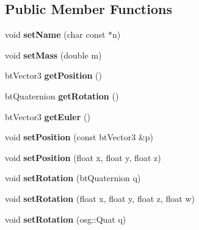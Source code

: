 \subsection*{Public Member Functions}
\begin{DoxyCompactItemize}
\item 
\mbox{\label{classbtosgObject_ab06a1b3f357209214c6440cd5746523e}} 
void {\bfseries set\+Name} (char const $\ast$n)
\item 
\mbox{\label{classbtosgObject_a91da93c82d48b86192f0cbb16054fe57}} 
void {\bfseries set\+Mass} (double m)
\item 
\mbox{\label{classbtosgObject_a77a1434498d7a6d00c415042a995d119}} 
bt\+Vector3 {\bfseries get\+Position} ()
\item 
\mbox{\label{classbtosgObject_a9cadb03762699412552601196950a039}} 
bt\+Quaternion {\bfseries get\+Rotation} ()
\item 
\mbox{\label{classbtosgObject_afef1fe06635566ab9cee134f72439e02}} 
bt\+Vector3 {\bfseries get\+Euler} ()
\item 
\mbox{\label{classbtosgObject_ad0f76df8e8bde6c8a9d1b1d53551172b}} 
void {\bfseries set\+Position} (const bt\+Vector3 \&p)
\item 
\mbox{\label{classbtosgObject_adb9f2cff0faf66dc252cd7c97b11ac84}} 
void {\bfseries set\+Position} (float x, float y, float z)
\item 
\mbox{\label{classbtosgObject_a656412794a971a10478aedb520f298bf}} 
void {\bfseries set\+Rotation} (bt\+Quaternion q)
\item 
\mbox{\label{classbtosgObject_a4d21ca59b944fd26644db35d3e9ba67a}} 
void {\bfseries set\+Rotation} (float x, float y, float z, float w)
\item 
\mbox{\label{classbtosgObject_ae803e0566f0d7b3ffca686b968b297f8}} 
void {\bfseries set\+Rotation} (osg\+::\+Quat q)
\item 
\mbox{\label{classbtosgObject_aff54acbc7c66811efb0cf2838107a241}} 

\end{DoxyCompactItemize}
